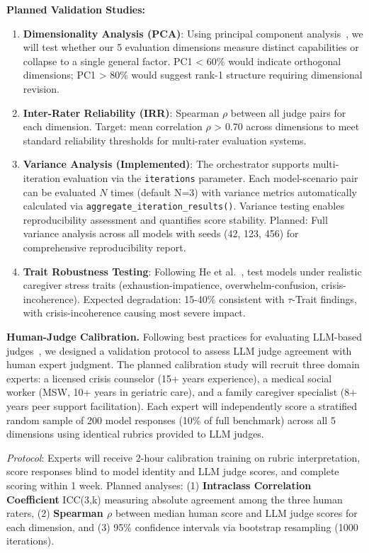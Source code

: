 \documentclass{article}
\begin{document}
\textbf{Planned Validation Studies:}
\begin{enumerate}
    \item \textbf{Dimensionality Analysis (PCA)}: Using principal component analysis~\cite{jolliffe2016pca}, we will test whether our 5 evaluation dimensions measure distinct capabilities or collapse to a single general factor. PC1 < 60\% would indicate orthogonal dimensions; PC1 > 80\% would suggest rank-1 structure requiring dimensional revision.

    \item \textbf{Inter-Rater Reliability (IRR)}: Spearman $\rho$ between all judge pairs for each dimension. Target: mean correlation $\rho$ > 0.70 across dimensions to meet standard reliability thresholds for multi-rater evaluation systems.

    \item \textbf{Variance Analysis (Implemented)}: The orchestrator supports multi-iteration evaluation via the \texttt{iterations} parameter. Each model-scenario pair can be evaluated $N$ times (default N=3) with variance metrics automatically calculated via \texttt{aggregate\_iteration\_results()}. Variance testing enables reproducibility assessment and quantifies score stability. Planned: Full variance analysis across all models with seeds (42, 123, 456) for comprehensive reproducibility report.

    \item \textbf{Trait Robustness Testing}: Following He et al.~\cite{he2025impatient}, test models under realistic caregiver stress traits (exhaustion-impatience, overwhelm-confusion, crisis-incoherence). Expected degradation: 15-40\% consistent with $\tau$-Trait findings, with crisis-incoherence causing most severe impact.
\end{enumerate}

\textbf{Human-Judge Calibration.} Following best practices for evaluating LLM-based judges~\cite{tan2024judgebench}, we designed a validation protocol to assess LLM judge agreement with human expert judgment. The planned calibration study will recruit three domain experts: a licensed crisis counselor (15+ years experience), a medical social worker (MSW, 10+ years in geriatric care), and a family caregiver specialist (8+ years peer support facilitation). Each expert will independently score a stratified random sample of 200 model responses (10\% of full benchmark) across all 5 dimensions using identical rubrics provided to LLM judges.

\textit{Protocol}: Experts will receive 2-hour calibration training on rubric interpretation, score responses blind to model identity and LLM judge scores, and complete scoring within 1 week. Planned analyses: (1) \textbf{Intraclass Correlation Coefficient} ICC(3,k) measuring absolute agreement among the three human raters, (2) \textbf{Spearman $\rho$} between median human score and LLM judge scores for each dimension, and (3) 95\% confidence intervals via bootstrap resampling (1000 iterations).
\end{document}
